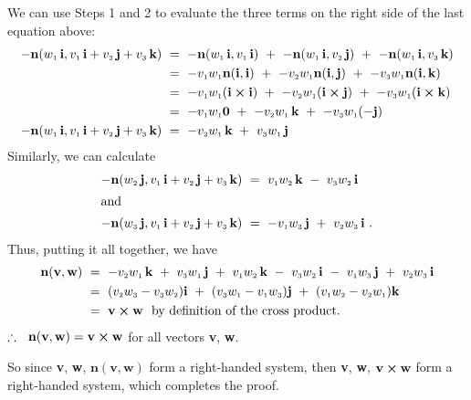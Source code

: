 We can use Steps 1 and 2 to evaluate the three terms on the right side of the last equation above:
\begin{align*}
 -\textbf{n}(\ssub{w}{1}\,\textbf{i},\vecthreeijk{v}) ~&=~ -\textbf{n}(\ssub{w}{1}\,\textbf{i},\ssub{v}{1}\,\textbf{i}) ~+~
 -\textbf{n}(\ssub{w}{1}\,\textbf{i},\ssub{v}{2}\,\textbf{j}) ~+~
 -\textbf{n}(\ssub{w}{1}\,\textbf{i},\ssub{v}{3}\,\textbf{k})\\
 &=~ -\ssub{v}{1}\ssub{w}{1}\textbf{n}(\textbf{i},\textbf{i}) ~+~ -\ssub{v}{2}\ssub{w}{1}\textbf{n}(\textbf{i},\textbf{j})
  ~+~ -\ssub{v}{3}\ssub{w}{1}\textbf{n}(\textbf{i},\textbf{k})\\
 &=~ -\ssub{v}{1}\ssub{w}{1}(\Crossprod{\textbf{i}}{\textbf{i}}) ~+~
    -\ssub{v}{2}\ssub{w}{1}(\Crossprod{\textbf{i}}{\textbf{j}}) ~+~
    -\ssub{v}{3}\ssub{w}{1}(\Crossprod{\textbf{i}}{\textbf{k}})\\
 &=~ -\ssub{v}{1}\ssub{w}{1}\textbf{0} ~+~ -\ssub{v}{2}\ssub{w}{1}\,\textbf{k} ~+~ -\ssub{v}{3}\ssub{w}{1}(-\textbf{j})\\
 -\textbf{n}(\ssub{w}{1}\,\textbf{i},\vecthreeijk{v}) ~&=~ -\ssub{v}{2}\ssub{w}{1}\,\textbf{k} ~+~
  \ssub{v}{3}\ssub{w}{1}\,\textbf{j}
\end{align*}
Similarly, we can calculate
\begin{align*}
 -\textbf{n}(\ssub{w}{2}\,\textbf{j},\vecthreeijk{v}) ~&=~ \ssub{v}{1}\ssub{w}{2}\,\textbf{k} ~-~
  \ssub{v}{3}\ssub{w}{2}\,\textbf{i}\\
 \intertext{and}
 -\textbf{n}(\ssub{w}{3}\,\textbf{j},\vecthreeijk{v}) ~&=~ -\ssub{v}{1}\ssub{w}{3}\,\textbf{j} ~+~
  \ssub{v}{2}\ssub{w}{3}\,\textbf{i} ~.
\end{align*}
Thus, putting it all together, we have
\begin{align*}
 \textbf{n}(\textbf{v},\textbf{w}) ~&=~ -\ssub{v}{2}\ssub{w}{1}\,\textbf{k} ~+~ \ssub{v}{3}\ssub{w}{1}\,\textbf{j} ~+~
  \ssub{v}{1}\ssub{w}{2}\,\textbf{k} ~-~ \ssub{v}{3}\ssub{w}{2}\,\textbf{i} ~-~ \ssub{v}{1}\ssub{w}{3}\,\textbf{j} ~+~
  \ssub{v}{2}\ssub{w}{3}\,\textbf{i}\\
 &=~ (\ssub{v}{2}\ssub{w}{3} - \ssub{v}{3}\ssub{w}{2})\textbf{i} ~+~ (\ssub{v}{3}\ssub{w}{1} -
  \ssub{v}{1}\ssub{w}{3})\textbf{j} ~+~ (\ssub{v}{1}\ssub{w}{2} - \ssub{v}{2}\ssub{w}{1})\textbf{k}\\
 &=~ \Crossprod{\textbf{v}}{\textbf{w}} \text{~~by definition of the cross product.}
\end{align*}
$\therefore ~~ \textbf{n}(\textbf{v},\textbf{w}) = \Crossprod{\textbf{v}}{\textbf{w}}$ for all vectors \textbf{v},
\textbf{w}.\enskip\checkmark\vspace{1mm}
\par\noindent So since \textbf{v}, \textbf{w}, $\textbf{n}(\textbf{v},\textbf{w})$ form a right-handed system, then
\textbf{v}, \textbf{w}, $\Crossprod{\textbf{v}}{\textbf{w}}$ form a right-handed system, which completes the proof.
